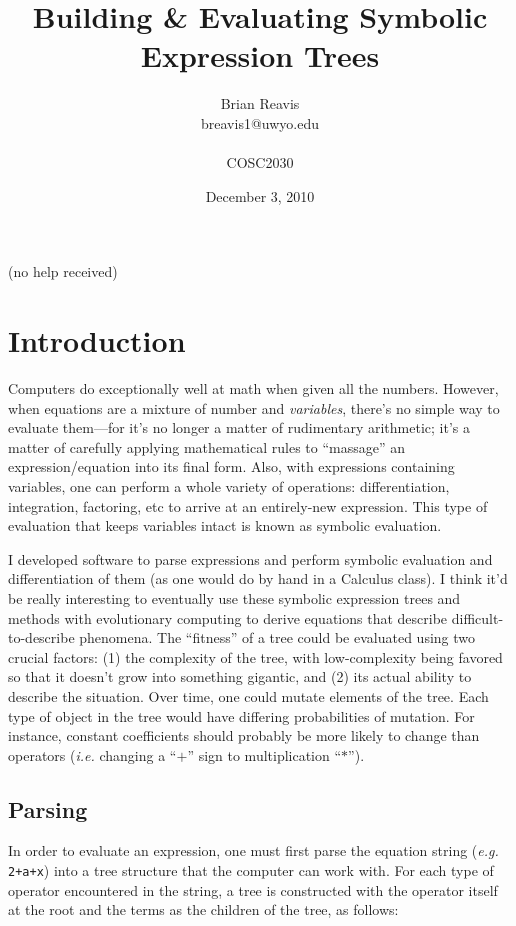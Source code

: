 \documentclass{article}
\title{Building \& Evaluating Symbolic Expression Trees}
\author{Brian Reavis\\breavis1@uwyo.edu\\\\COSC2030}
\date{December 3, 2010} %
\begin{document}
\maketitle
\tableofcontents
\begin{center}

\vspace{1em}
(no help received)
\end{center}
\clearpage
\setlength{\parskip}{12pt}

\section{Introduction}

Computers do exceptionally well at math when given all the numbers. However, when equations are a mixture of number and {\em variables}, there's no simple way to evaluate them---for it's no longer a matter of rudimentary arithmetic; it's a matter of carefully applying mathematical rules to ``massage'' an expression/equation into its final form. Also, with expressions containing variables, one can perform a whole variety of operations: differentiation, integration, factoring, etc to arrive at an entirely-new expression. This type of evaluation that keeps variables intact is known as symbolic evaluation.

I developed software to parse expressions and perform symbolic evaluation and differentiation of them (as one would do by hand in a Calculus class). I think it'd be really interesting to eventually use these symbolic expression trees and methods with evolutionary computing to derive equations that describe difficult-to-describe phenomena. The ``fitness'' of a tree could be evaluated using two crucial factors: (1) the complexity of the tree, with low-complexity being favored so that it doesn't grow into something gigantic, and (2) its actual ability to describe the situation. Over time, one could mutate elements of the tree. Each type of object in the tree would have differing probabilities of mutation. For instance, constant coefficients should probably be more likely to change than operators (\emph{i.e.} changing a ``$+$'' sign to multiplication ``$*$''). 

\subsection{Parsing}

In order to evaluate an expression, one must first parse the equation string (\emph{e.g.} \verb|2+a+x|) into a tree structure that the computer can work with. For each type of operator encountered in the string, a tree is constructed with the operator itself at the root and the terms as the children of the tree, as follows:
\end{document}
